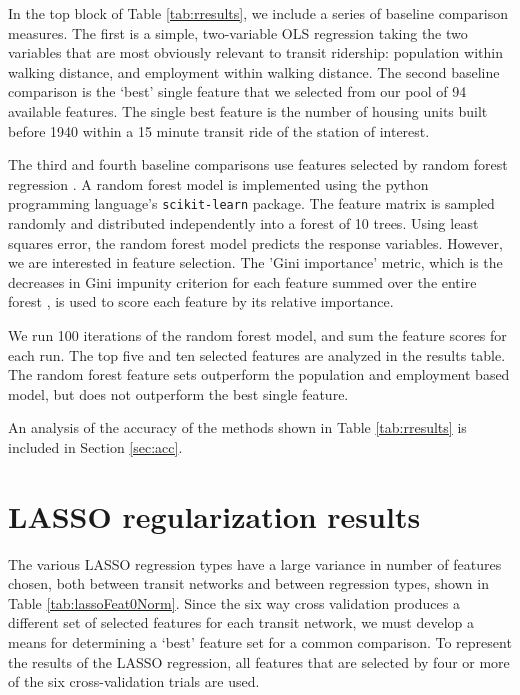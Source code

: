 \documentclass[11pt]{report}
\begin{document}
In the top block of Table \ref{tab:rresults}, we include a series of baseline comparison measures. The first is a simple, two-variable OLS regression taking the two variables that are most obviously relevant to transit ridership: population within walking distance, and employment within walking distance. The second baseline comparison is the `best' single feature that we selected from our pool of 94 available features. The single best feature is the number of housing units built before 1940 within a 15 minute transit ride of the station of interest. 

The third and fourth baseline comparisons use features selected by random forest regression \cite{Breiman2001}. A random forest model is implemented using the python programming language's \texttt{scikit-learn} package. The feature matrix is sampled randomly and distributed independently into a forest of 10 trees. Using least squares error, the random forest model predicts the response variables. However, we are interested in feature selection. The 'Gini importance' metric, which is the decreases in Gini impunity criterion for each feature summed over the entire forest \cite{Breiman1984}, is used to score each feature by its relative importance.  

We run 100 iterations of the random forest model, and sum the feature scores for each run. The top five and ten selected features are analyzed in the results table. The random forest feature sets outperform the population and employment based model, but does not outperform the best single feature. 


An analysis of the accuracy of the methods shown in Table \ref{tab:rresults} is included in Section \ref{sec:acc}.

\section{LASSO regularization results}

The various LASSO regression types have a large variance in number of features chosen, both between transit networks and between regression types, shown in Table \ref{tab:lassoFeat0Norm}. Since the six way cross validation produces a different set of selected features for each transit network, we must develop a means for determining a `best' feature set for a common comparison. To represent the results of the LASSO regression, all features that are selected by four or more of the six cross-validation trials are used. 
\end{document}
